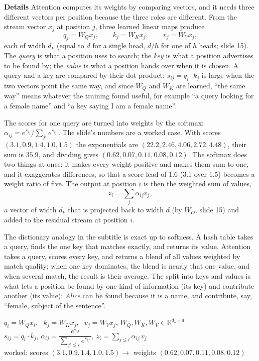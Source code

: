 \documentclass[11pt,letterpaper]{article}
\newcommand{\para}[1]{\medskip\noindent\textbf{#1}\quad}
\newenvironment{formulas}{\begin{tcolorbox}[formulabox]}{\end{tcolorbox}}
\newcommand{\dk}{d_k}
\begin{document}
\para{Details} Attention computes its weights by comparing vectors, and it needs three different vectors per position because the three roles are different. From the stream vector $x_j$ at position $j$, three learned linear maps produce
\[
q_j=W_Qx_j,\qquad k_j=W_Kx_j,\qquad v_j=W_Vx_j,
\]
each of width $\dk$ (equal to $d$ for a single head, $d/h$ for one of $h$ heads; slide 15). The \emph{query} is what a position uses to search; the \emph{key} is what a position advertises to be found by; the \emph{value} is what a position hands over when it is chosen. A query and a key are compared by their dot product: $s_{ij}=q_i\cdot k_j$ is large when the two vectors point the same way, and since $W_Q$ and $W_K$ are learned, ``the same way'' means whatever the training found useful, for example ``a query looking for a female name'' and ``a key saying I am a female name''.

The scores for one query are turned into weights by the softmax: $\alpha_{ij}=e^{s_{ij}}/\sum_{j'}e^{s_{ij'}}$. The slide's numbers are a worked case. With scores $(3.1,0.9,1.4,1.0,1.5)$ the exponentials are $(22.2,2.46,4.06,2.72,4.48)$, their sum is $35.9$, and dividing gives $(0.62,0.07,0.11,0.08,0.12)$. The softmax does two things at once: it makes every weight positive and makes them sum to one, and it exaggerates differences, so that a score lead of 1.6 (3.1 over 1.5) becomes a weight ratio of five. The output at position $i$ is then the weighted sum of values,
\[
z_i=\sum_j\alpha_{ij}v_j,
\]
a vector of width $\dk$ that is projected back to width $d$ (by $W_O$, slide 15) and added to the residual stream at position $i$.

The dictionary analogy in the subtitle is exact up to softness. A hash table takes a query, finds the one key that matches exactly, and returns its value. Attention takes a query, scores every key, and returns a blend of all values weighted by match quality; when one key dominates, the blend is nearly that one value, and when several match, the result is their average. The split into keys and values is what lets a position be found by one kind of information (its key) and contribute another (its value): \emph{Alice} can be found because it is a name, and contribute, say, ``female, subject of the sentence''.

\begin{formulas}
$q_i=W_Qx_i$, \ $k_j=W_Kx_j$, \ $v_j=W_Vx_j$, \quad $W_Q,W_K,W_V\in\mathbb{R}^{\dk\times d}$\\[3pt]
$s_{ij}=q_i\cdot k_j$, \quad $\alpha_{ij}=\dfrac{e^{s_{ij}}}{\sum_{j'\le i}e^{s_{ij'}}}$, \quad $z_i=\sum_{j\le i}\alpha_{ij}\,v_j$\\[3pt]
worked: scores $(3.1,0.9,1.4,1.0,1.5)\to$ weights $(0.62,0.07,0.11,0.08,0.12)$
\end{formulas}
\end{document}
